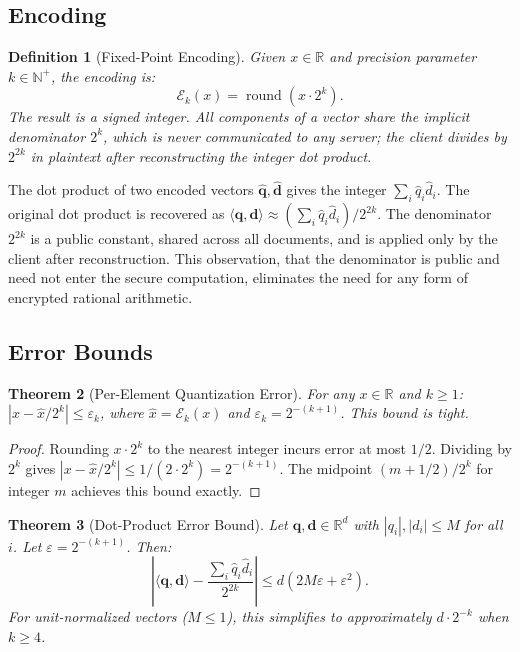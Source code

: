 \documentclass[11pt]{article}
\newtheorem{theorem}{Theorem}[section]
\newtheorem{definition}[theorem]{Definition}
\newcommand{\R}{\mathbb{R}}
\newcommand{\N}{\mathbb{N}}
\begin{document}
\subsection{Encoding}

\begin{definition}[Fixed-Point Encoding]
\label{def:encoding}
Given $x \in \R$ and precision parameter $k \in \N^+$, the encoding is:
\[
\mathcal{E}_k(x) = \operatorname{round}(x \cdot 2^k).
\]
The result is a signed integer. All components of a vector share the implicit denominator $2^k$, which is never communicated to any server; the client divides by $2^{2k}$ in plaintext after reconstructing the integer dot product.
\end{definition}

The dot product of two encoded vectors $\hat{\mathbf{q}}, \hat{\mathbf{d}}$ gives the integer $\sum_i \hat{q}_i \hat{d}_i$. The original dot product is recovered as $\langle \mathbf{q}, \mathbf{d} \rangle \approx (\sum_i \hat{q}_i \hat{d}_i) / 2^{2k}$. The denominator $2^{2k}$ is a public constant, shared across all documents, and is applied only by the client after reconstruction. This observation, that the denominator is public and need not enter the secure computation, eliminates the need for any form of encrypted rational arithmetic.

\subsection{Error Bounds}

\begin{theorem}[Per-Element Quantization Error]
\label{thm:quant-error}
For any $x \in \R$ and $k \geq 1$: $|x - \hat{x}/2^k| \leq \varepsilon_k$, where $\hat{x} = \mathcal{E}_k(x)$ and $\varepsilon_k = 2^{-(k+1)}$. This bound is tight.
\end{theorem}

\begin{proof}
Rounding $x \cdot 2^k$ to the nearest integer incurs error at most $1/2$. Dividing by $2^k$ gives $|x - \hat{x}/2^k| \leq 1/(2 \cdot 2^k) = 2^{-(k+1)}$. The midpoint $(m + 1/2)/2^k$ for integer $m$ achieves this bound exactly.
\end{proof}

\begin{theorem}[Dot-Product Error Bound]
\label{thm:dot-error}
Let $\mathbf{q}, \mathbf{d} \in \R^d$ with $|q_i|, |d_i| \leq M$ for all $i$. Let $\varepsilon = 2^{-(k+1)}$. Then:
\[
\left| \langle \mathbf{q}, \mathbf{d} \rangle - \frac{\sum_i \hat{q}_i \hat{d}_i}{2^{2k}} \right| \leq d(2M\varepsilon + \varepsilon^2).
\]
For unit-normalized vectors ($M \leq 1$), this simplifies to approximately $d \cdot 2^{-k}$ when $k \geq 4$.
\end{theorem}
\end{document}
